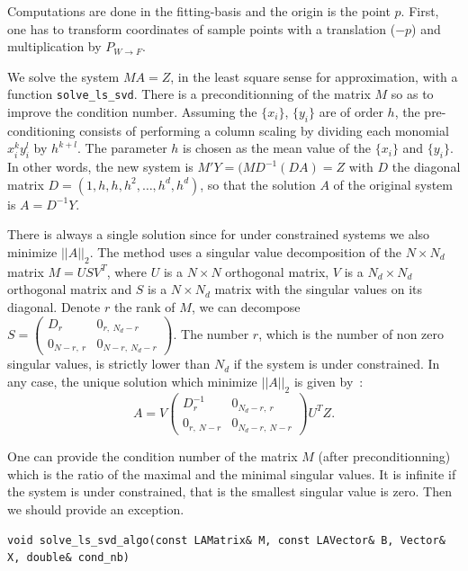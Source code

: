 Computations are done in the fitting-basis and the origin is the point
$p$. First, one has to transform coordinates of sample points with a
translation ($-p$) and multiplication by $ P_{W\rightarrow F}$.


We solve the system $MA=Z$, in the least square sense for
approximation, with a function {\tt solve\_ls\_svd}. There is a
preconditionning of the matrix $M$ so as to improve the condition
number. Assuming the $\{x_i\}$, $\{y_i\}$ are of order $h$, the
pre-conditioning consists of performing a column scaling by dividing
each monomial $x_i^ky_i^l$ by $h^{k+l}$. The parameter $h$ is chosen
as the mean value of the $\{x_i\}$ and $\{y_i\}$. In other words, the
new system is $M'Y=(MD^{-1}(DA)=Z$ with $D$ the diagonal matrix
$D=(1,h,h,h^2,\ldots,h^d,h^d)$, so that the solution $A$ of the
original system is $A=D^{-1}Y$.  

There is always a single solution since for under constrained systems
we also minimize $||A||_2$.  The method uses a singular value
decomposition of the $N\times N_d$ matrix $M= U S V^T$, where $U$ is a
$N \times N$ orthogonal matrix, $V$ is a $N_d \times N_d$ orthogonal
matrix and $S$ is a $N\times N_d$ matrix with the singular values on
its diagonal. Denote $r$ the rank of $M$, we can decompose
%
$S= \left( \begin{array}{cc}
D_r & 0_{r,\ N_d-r}\\
0_{N-r,\ r} & 0_{N-r,\ N_d-r}
\end{array} 
\right).
$
%
The number $r$, which is the number of non zero singular values, is
strictly lower than $N_d$ if the system is under constrained. In any
case, the unique solution which minimize $||A||_2$ is given by~:
\begin{equation}
A= V
\left( \begin{array}{cc}
D_r^{-1} & 0_{N_d-r,\ r}\\
0_{r,\ N-r} & 0_{N_d-r,\ N-r}
\end{array} 
\right)
 U^TZ.
\end{equation}

One can provide the condition number
of the matrix $M$ (after preconditionning) which is the ratio of the
maximal and the minimal singular values. It is infinite if the system
is under constrained, that is the smallest singular value is
zero. Then we should provide an exception.

\begin{verbatim}
void solve_ls_svd_algo(const LAMatrix& M, const LAVector& B, Vector& X, double& cond_nb)
\end{verbatim} 
 
